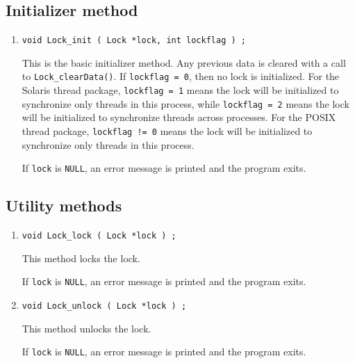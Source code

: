 \subsection{Initializer method}
\label{subsection:Lock:proto:initializers}
\par
\begin{enumerate}
\item
\begin{verbatim}
void Lock_init ( Lock *lock, int lockflag ) ;
\end{verbatim}
This is the basic initializer method.
Any previous data is cleared with a call to {\tt Lock\_clearData()}.
If {\tt lockflag = 0}, then no lock is initialized.
For the Solaris thread package, {\tt lockflag = 1} means the lock
will be initialized to synchronize only threads in this process,
while {\tt lockflag = 2} means the lock
will be initialized to synchronize threads across processes.
For the POSIX thread package, {\tt lockflag != 0} means the lock
will be initialized to synchronize only threads in this process.
\par {}
If {\tt lock} is {\tt NULL},
an error message is printed and the program exits.
\end{enumerate}
\par
\subsection{Utility methods}
\label{subsection:Lock:proto:Utility}
\par
\begin{enumerate}
\item
\begin{verbatim}
void Lock_lock ( Lock *lock ) ;
\end{verbatim}
This method locks the lock.
\par {}
If {\tt lock} is {\tt NULL},
an error message is printed and the program exits.
\item
\begin{verbatim}
void Lock_unlock ( Lock *lock ) ;
\end{verbatim}
This method unlocks the lock.
\par {}
If {\tt lock} is {\tt NULL},
an error message is printed and the program exits.
\end{enumerate}

